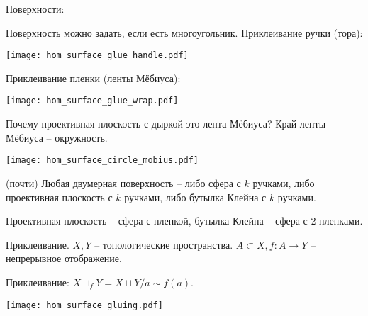 \documentclass[main]{subfiles}
\begin{document}
Поверхности:

Поверхность можно задать, если есть многоугольник.
Приклеивание ручки (тора):
\begin{center}
    \texttt{[image: hom\_surface\_glue\_handle.pdf]}
\end{center}
Приклеивание пленки (ленты Мёбиуса):
\begin{center}
    \texttt{[image: hom\_surface\_glue\_wrap.pdf]}
\end{center}

Почему проективная плоскость с дыркой это лента Мёбиуса?
Край ленты Мёбиуса -- окружность.
\begin{center}
    \texttt{[image: hom\_surface\_circle\_mobius.pdf]}
\end{center}

\begin{theorem}
    (почти) Любая двумерная поверхность -- либо сфера с $k$ ручками, либо проективная плоскость с $k$ ручками, либо бутылка Клейна с $k$ ручками.
\end{theorem}

Проективная плоскость -- сфера с пленкой, бутылка Клейна -- сфера с 2 пленками.

\begin{example}
    Приклеивание. $X, Y$ -- топологические пространства.
    $A \subset X, f: A \to Y$ -- непрерывное отображение.

    Приклеивание: $X \sqcup_f Y = X \sqcup Y / a \sim f(a)$.
    \begin{center}
        \texttt{[image: hom\_surface\_gluing.pdf]}
    \end{center}
\end{example}
\end{document}
